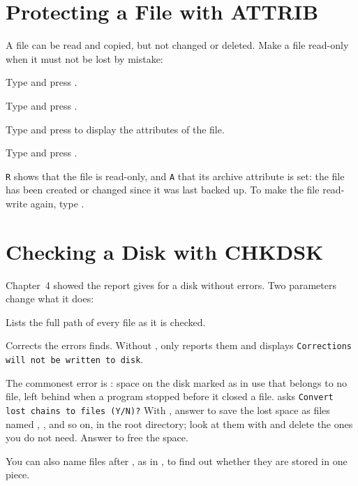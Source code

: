 \section{Protecting a File with ATTRIB}
A  file can be read and copied, but not changed or deleted.
Make a file read-only when it must not be lost by mistake:
\begin{Steps}
\item Type  and press .
\item Type  and press .
\item Type  and press  to display the
  attributes of the file.
\item Type  and press .
\end{Steps}


\texttt{R} shows that the file is read-only, and \texttt{A} that its archive
attribute is set: the file has been created or changed since it was last
backed up.  To make the file read-write again, type
.

\section{Checking a Disk with CHKDSK}
Chapter~4 showed the report  gives for a disk without errors.
Two parameters change what it does:

Lists the full path of every file as it is checked.

Corrects the errors  finds.  Without ,
 only reports them and displays \texttt{Corrections will not be
written to disk}.

The commonest error is : space on the disk
marked as in use that belongs to no file, left behind when a program stopped
before it closed a file.   asks
\texttt{Convert lost chains to files (Y/N)?}  With , answer 
to save the lost space as files named ,
, and so on, in the root directory; look at them with
 and delete the ones you do not need.  Answer  to free the
space.

You can also name files after , as in , to
find out whether they are stored in one piece.

